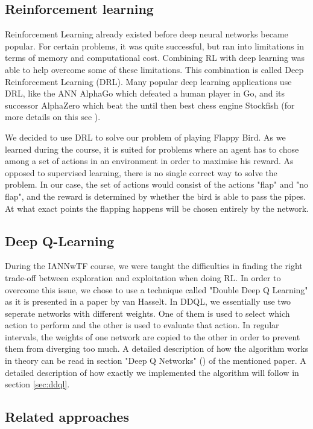 \subsection{Reinforcement learning}
Reinforcement Learning already existed before deep neural networks became popular. For certain problems, it was quite successful, but ran into limitations in terms of memory and computational cost. Combining RL with deep learning was able to help overcome some of these limitations. This combination is called Deep Reinforcement Learning (DRL). Many popular deep learning applications use DRL, like the ANN AlphaGo which defeated a human player in Go, and its successor AlphaZero which beat the until then best chess engine Stockfish (for more details on this see \cite{DRLsurv}).
\par
We decided to use DRL to solve our problem of playing Flappy Bird. As we learned during the course, it is suited for problems where an agent has to chose among a set of actions in an environment in order to maximise his reward. As opposed to supervised learning, there is no single correct way to solve the problem. In our case, the set of actions would consist of the actions "flap" and "no flap", and the reward is determined by whether the bird is able to pass the pipes. At what exact points the flapping happens will be chosen entirely by the network.


\subsection{Deep Q-Learning}
During the IANNwTF course, we were taught the difficulties in finding the right trade-off between exploration and exploitation when doing RL. In order to overcome this issue, we chose to use a technique called "Double Deep Q Learning" as it is presented in a paper by van Hasselt\cite{DDQL}. In DDQL, we essentially use two seperate networks with different weights. One of them is used to select which action to perform and the other is used to evaluate that action. In regular intervals, the weights of one network are copied to the other in order to prevent them from diverging too much. A detailed description of how the algorithm works in theory can be read in section "Deep Q Networks" (\cite[p. 2]{DDQL}) of the mentioned paper. A detailed description of how exactly we implemented the algorithm will follow in section \ref{sec:ddql}.

\subsection{Related approaches}\label{sec:related}

